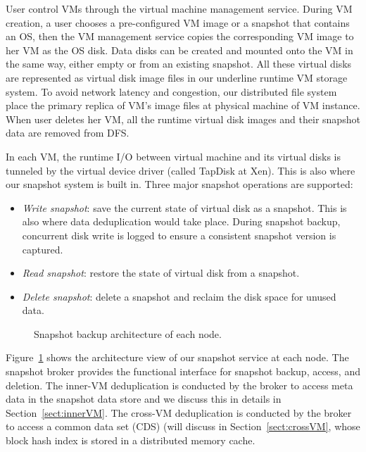 User control VMs through the virtual machine management service.
During VM creation, a user chooses a pre-configured VM image or
a snapshot that contains an OS,
then the VM management service 
copies the corresponding VM image to her VM as the OS disk.
Data disks can be created and mounted onto the VM in the same way,
either empty or from an existing snapshot. 
All these virtual disks are represented as virtual disk image files in our
underline runtime VM storage system.  
To avoid network latency and congestion, 
our distributed file system place the primary replica of VM's 
image files at physical machine of VM instance.
When user deletes her VM, all the runtime virtual disk images and
their snapshot data are removed from DFS.

In each VM, 
the runtime I/O between virtual machine and its virtual
disks is tunneled by the virtual device driver (called TapDisk\cite{Warfield2005} at Xen).
This is also where our snapshot system is built in. Three major snapshot operations are supported:
\begin{itemize}
\item \textit{Write snapshot}: save the current state of virtual disk as a snapshot.
This is also where data deduplication would take place.
During snapshot backup, concurrent disk write is logged 
to ensure a consistent snapshot version is captured. 
\item \textit{Read snapshot}: restore the state of virtual disk from a snapshot.
\item \textit{Delete snapshot}: delete a snapshot and reclaim the disk space for unused data.
\end{itemize}

\begin{figure}[htbp]
  \centering
  \caption{Snapshot backup architecture of each node.}
  \label{fig:arch}
\end{figure}

Figure~\ref{fig:arch} shows the architecture view of our snapshot service
at each node. The snapshot broker provides the functional interface for  snapshot backup, access, and deletion.
The inner-VM  deduplication is conducted by the broker to access meta data in the snapshot data store
and we discuss this in details in Section~\ref{sect:innerVM}.
The cross-VM deduplication is conducted by the broker to access 
a common data set (CDS) (will discuss in Section~\ref{sect:crossVM},
whose block hash index is stored in a distributed memory cache. 

%


